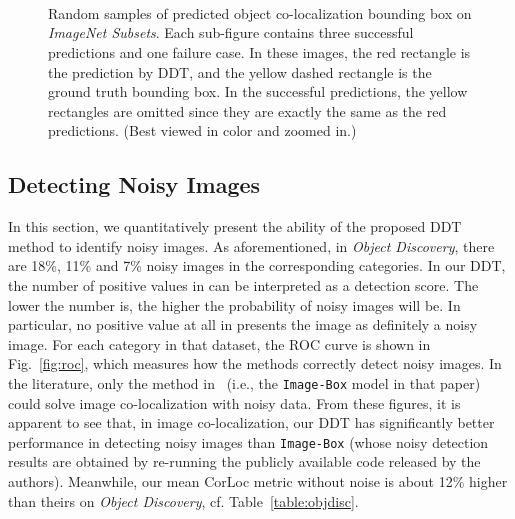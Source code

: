 \documentclass[twocolumn]{svjour3}          \smartqed  \usepackage{graphicx}
\begin{document}
\begin{figure*}[t]
 \centering
	~~

	~~

	~~
\caption{Random samples of predicted object co-localization bounding box on \emph{ImageNet Subsets}. Each sub-figure contains three successful predictions and one failure case. In these images, the red rectangle is the prediction by DDT, and the yellow dashed rectangle is the ground truth bounding box. In the successful predictions, the yellow rectangles are omitted since they are exactly the same as the red predictions. (Best viewed in color and zoomed in.)} \label{fig:bbox}
\end{figure*}

\subsection{Detecting Noisy Images}\label{sec:noise}

In this section, we quantitatively present the ability of the proposed DDT method to identify noisy images. As aforementioned, in \emph{Object Discovery}, there are 18\%, 11\% and 7\% noisy images in the corresponding categories. In our DDT, the number of positive values in  can be interpreted as a detection score. The lower the number is, the higher the probability of noisy images will be. In particular, no positive value at all in  presents the image as definitely a noisy image. For each category in that dataset, the ROC curve is shown in Fig.~\ref{fig:roc}, which measures how the methods correctly detect noisy images. In the literature, only the method in~\citep{tangcvpr2014} (i.e., the \texttt{Image-Box} model in that paper) could solve image co-localization with noisy data. From these figures, it is apparent to see that, in image co-localization, our DDT has significantly better performance in detecting noisy images than \texttt{Image-Box} (whose noisy detection results are obtained by re-running the publicly available code released by the authors). Meanwhile, our mean CorLoc metric without noise is about 12\% higher than theirs on \emph{Object Discovery}, cf. Table~\ref{table:objdisc}.
\end{document}
